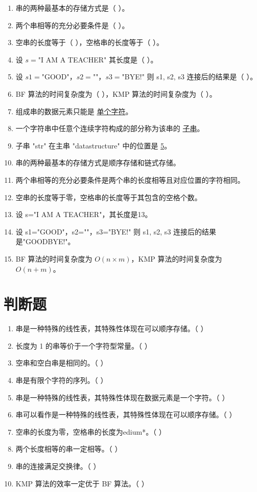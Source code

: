 \documentclass[12pt, a4paper]{article}
\begin{document}
\begin{enumerate}
	\item 串的两种最基本的存储方式是（ ）。
	\item 两个串相等的充分必要条件是（ ）。
	\item 空串的长度等于（ ），空格串的长度等于（ ）。
	\item 设 $s=$"I AM A TEACHER" 其长度是（ ）。
	\item 设 $s1=$"GOOD"，$s2=$""，$s3=$"BYE!" 则 s1, s2, s3 连接后的结果是（ ）。
	\item BF 算法的时间复杂度为（ ），KMP 算法的时间复杂度为（ ）。
	\item 组成串的数据元素只能是 \underline{单个字符}。
	\item 一个字符串中任意个连续字符构成的部分称为该串的 \underline{子串}。
	\item 子串 "str" 在主串 "datastructure" 中的位置是 \underline{5}。
	\item 串的两种最基本的存储方式是顺序存储和链式存储。
	\item 两个串相等的充分必要条件是两个串的长度相等且对应位置的字符相同。
	\item 空串的长度等于零，空格串的长度等于其包含的空格个数。
	\item 设 s="I AM A TEACHER"，其长度是13。
	\item 设 s1="GOOD"，s2=""，s3="BYE!" 则 s1, s2, s3 连接后的结果是"GOODBYE!"。
	\item BF 算法的时间复杂度为 $O(n \times m)$，KMP 算法的时间复杂度为 $O(n+m)$。
\end{enumerate}

\section*{判断题}

\begin{enumerate}
	\item 串是一种特殊的线性表，其特殊性体现在可以顺序存储。（ ）
	\item 长度为 1 的串等价于一个字符型常量。（ ）
	\item 空串和空白串是相同的。（ ）
	\item 串是有限个字符的序列。（ ）
	\item 串是一种特殊的线性表，其特殊性体现在数据元素是一个字符。（ ）
	\item 串可以看作是一种特殊的线性表，其特殊性体现在可以顺序存储。（ ）
	\item 空串的长度为零，空格串的长度为edium*。（ ）
	\item 两个长度相等的串一定相等。（ ）
	\item 串的连接满足交换律。（ ）
	\item KMP 算法的效率一定优于 BF 算法。（ ）
\end{enumerate}
\end{document}
